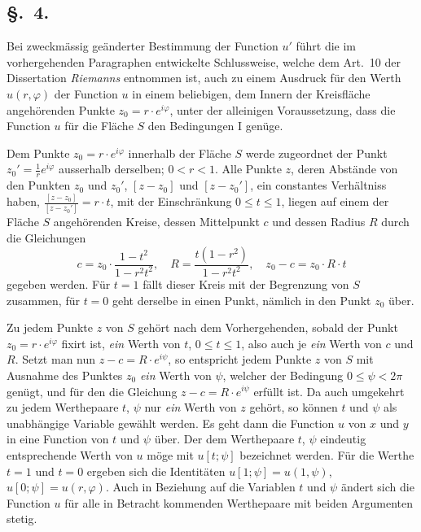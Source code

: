 \documentclass{article}
\begin{document}
\subsection*{§.~4.}

Bei zweckmässig geänderter Bestimmung der Function $u'$ führt die im vorhergehenden Paragraphen entwickelte Schlussweise, welche dem Art.~10 der Dissertation \emph{Riemanns} entnommen ist, auch zu einem Ausdruck für den Werth $u(r, \varphi)$ der Function $u$ in einem beliebigen, dem Innern der Kreisfläche angehörenden Punkte $z_0 = r \cdot e^{i\varphi}$, unter der alleinigen Voraussetzung, dass die Function $u$ für die Fläche $S$ den Bedingungen I genüge.

Dem Punkte $z_0 = r \cdot e^{i\varphi}$ innerhalb der Fläche $S$ werde zugeordnet der Punkt $z_0' = \frac{1}{r} e^{i\varphi}$ ausserhalb derselben; $0 < r < 1$. Alle Punkte $z$, deren Abstände von den Punkten $z_0$ und $z_0'$, $[z - z_0]$ und $[z - z_0']$, ein constantes Verhältniss haben, $\frac{[z - z_0]}{[z - z_0']} = r \cdot t$, mit der Einschränkung $0 \le t \le 1$, liegen auf einem der Fläche $S$ angehörenden Kreise, dessen Mittelpunkt $c$ und dessen Radius $R$ durch die Gleichungen
\[
c = z_0 \cdot \frac{1 - t^2}{1 - r^2 t^2}, \quad R = \frac{t(1 - r^2)}{1 - r^2 t^2}, \quad z_0 - c = z_0 \cdot R \cdot t
\]
gegeben werden. Für $t = 1$ fällt dieser Kreis mit der Begrenzung von $S$ zusammen, für $t = 0$ geht derselbe in einen Punkt, nämlich in den Punkt $z_0$ über.

Zu jedem Punkte $z$ von $S$ gehört nach dem Vorhergehenden, sobald der Punkt $z_0 = r \cdot e^{i\varphi}$ fixirt ist, \emph{ein} Werth von $t$, $0 \le t \le 1$, also auch je \emph{ein} Werth von $c$ und $R$. Setzt man nun $z - c = R \cdot e^{i\psi}$, so entspricht jedem Punkte $z$ von $S$ mit Ausnahme des Punktes $z_0$ \emph{ein} Werth von $\psi$, welcher der Bedingung $0 \le \psi < 2\pi$ genügt, und für den die Gleichung $z - c = R \cdot e^{i\psi}$ erfüllt ist. Da auch umgekehrt zu jedem Werthepaare $t$, $\psi$ nur \emph{ein} Werth von $z$ gehört, so können $t$ und $\psi$ als unabhängige Variable gewählt werden. Es geht dann die Function $u$ von $x$ und $y$ in eine Function von $t$ und $\psi$ über. Der dem Werthepaare $t$, $\psi$ eindeutig entsprechende Werth von $u$ möge mit $u[t; \psi]$ bezeichnet werden. Für die Werthe $t = 1$ und $t = 0$ ergeben sich die Identitäten $u[1; \psi] = u(1, \psi)$, $u[0; \psi] = u(r, \varphi)$. Auch in Beziehung auf die Variablen $t$ und $\psi$ ändert sich die Function $u$ für alle in Betracht kommenden Werthepaare mit beiden Argumenten stetig.
\end{document}
